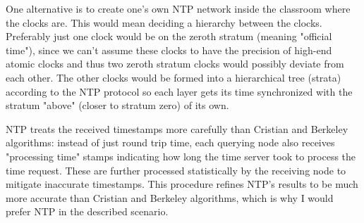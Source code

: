 \documentclass[12pt,a4paper,titlepage]{article}
\begin{document}
One alternative is to create one's own NTP network inside the classroom where the clocks are. This would mean deciding a hierarchy between the clocks. Preferably just one clock would be on the zeroth stratum (meaning "official time"), since we can't assume these clocks to have the precision of high-end atomic clocks and thus two zeroth stratum clocks would possibly deviate from each other. The other clocks would be formed into a hierarchical tree (strata) according to the NTP protocol so each layer gets its time synchronized with the stratum "above" (closer to stratum zero) of its own.

NTP treats the received timestamps more carefully than Cristian and Berkeley algorithms: instead of just round trip time, each querying node also receives "processing time" stamps indicating how long the time server took to process the time request. These are further processed statistically by the receiving node to mitigate inaccurate timestamps. This procedure refines NTP's results to be much more accurate than Cristian and Berkeley algorithms, which is why I would prefer NTP in the described scenario.
\end{document}
